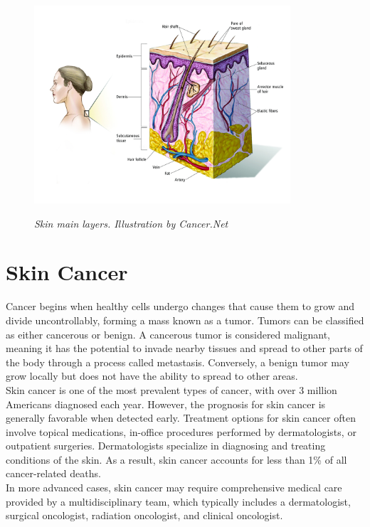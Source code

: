 \begin{figure}[H] \centering
  \includegraphics[width=0.85\textwidth]{imatges/problem_domain/melanoma-diagram.jpg}
  \caption[Skin main layers]{\textit{Skin main layers. Illustration by
Cancer.Net}} {\label{fig:melanoma_diagram}} \end{figure}

\section{Skin Cancer}

Cancer begins when healthy cells undergo changes that cause them to grow and
divide uncontrollably, forming a mass known as a tumor. Tumors can be
classified as either cancerous or benign. A cancerous tumor is considered
malignant, meaning it has the potential to invade nearby tissues and spread to
other parts of the body through a process called metastasis. Conversely, a
benign tumor may grow locally but does not have the ability to spread to other
areas. \\

Skin cancer is one of the most prevalent types of cancer, with over 3 million
Americans diagnosed each year. However, the prognosis for skin cancer is
generally favorable when detected early. Treatment options for skin cancer
often involve topical medications, in-office procedures performed by
dermatologists, or outpatient surgeries. Dermatologists specialize in
diagnosing and treating conditions of the skin. As a result, skin cancer
accounts for less than 1\% of all cancer-related deaths. \\

In more advanced cases, skin cancer may require comprehensive medical care
provided by a multidisciplinary team, which typically includes a dermatologist,
surgical oncologist, radiation oncologist, and clinical oncologist.

